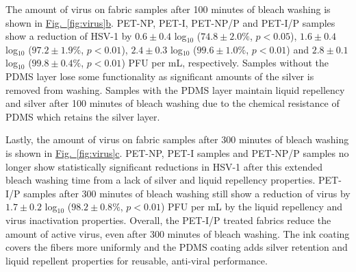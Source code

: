 \documentclass[journal=jacsat,manuscript=article]{achemso}
\newcommand{\figref}[2][]{\hyperref[#2]{Fig.~\ref{#2}#1}}
\begin{document}
The amount of virus on fabric samples after 100 minutes of bleach washing is shown in \figref[b]{fig:virus}. PET-NP, PET-I, PET-NP/P and PET-I/P samples show a reduction of HSV-1 by $0.6 \pm 0.4$ log$_{10}$ ($74.8 \pm 2.0 \%$, $p < 0.05$), $1.6 \pm 0.4$ log$_{10}$ ($97.2 \pm 1.9 \%$, $p < 0.01$), $2.4 \pm 0.3$ log$_{10}$ ($99.6 \pm 1.0 \%$, $p < 0.01$) and $2.8 \pm 0.1$ log$_{10}$ ($99.8 \pm 0.4 \%$, $p < 0.01$) PFU per mL,  respectively. Samples without the PDMS layer lose some functionality as significant amounts of the silver is removed from washing. Samples with the PDMS layer maintain liquid repellency and silver after 100 minutes of bleach washing due to the chemical resistance of PDMS which retains the silver layer. 


Lastly, the amount of virus on fabric samples after 300 minutes of bleach washing is shown in \figref[c]{fig:virus}. PET-NP, PET-I samples and PET-NP/P samples no longer show statistically significant reductions in HSV-1 after this extended bleach washing time from a lack of silver and liquid repellency properties. PET-I/P samples after 300 minutes of bleach washing still show a reduction of virus by $1.7 \pm 0.2$ log$_{10}$ ($98.2 \pm 0.8 \%$, $p < 0.01$) PFU per mL by the liquid repellency and virus inactivation properties. %
Overall, the PET-I/P treated fabrics reduce the amount of active virus, even after 300 minutes of bleach washing. The ink coating covers the fibers more uniformly and the PDMS coating adds silver retention and liquid repellent properties for reusable, anti-viral performance.
\end{document}
